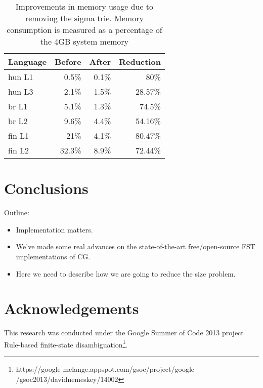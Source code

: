 \documentclass{article}
\begin{document}
\begin{table}[h]
  \centering
  \caption{Improvements in memory usage due to removing the sigma trie. Memory
           consumption is measured as a percentage of the 4GB system memory}
  \label{tab:sigma_memory}
  \begin{tabular}{ | l | r | r | r | }
  \hline
  \textbf{Language} & \textbf{Before} & \textbf{After} & \textbf{Reduction} \\
  \hline
  hun L1 & 0.5\% & 0.1\% & 80\% \\
  hun L3 & 2.1\% & 1.5\% & 28.57\% \\
  br L1 & 5.1\% & 1.3\% & 74.5\% \\
  br L2 & 9.6\% & 4.4\% & 54.16\% \\
  fin L1 & 21\% & 4.1\% & 80.47\% \\
  fin L2 & 32.3\% & 8.9\% & 72.44\% \\
  \hline
  \end{tabular}
\end{table}

\section{Conclusions}
\label{sec:conclusion}
Outline:
\begin{itemize}
\item Implementation matters.
\item We've made some real advances on the state-of-the-art free/open-source
  FST implementations of CG. 
\item Here we need to describe how we are going to reduce the size problem.
\end{itemize}

\section*{Acknowledgements}
This research was conducted under the Google Summer of Code 2013 project
Rule-based finite-state disambiguation\footnote{https://google-melange.appspot.com/gsoc/project/google
/gsoc2013/davidnemeskey/14002}.

\cite{Karlsson:1990} %
\cite{Hulden:2011} %
\cite{Peltonen:2011} %
\cite{Tapanainen:1996} %



\end{document}
